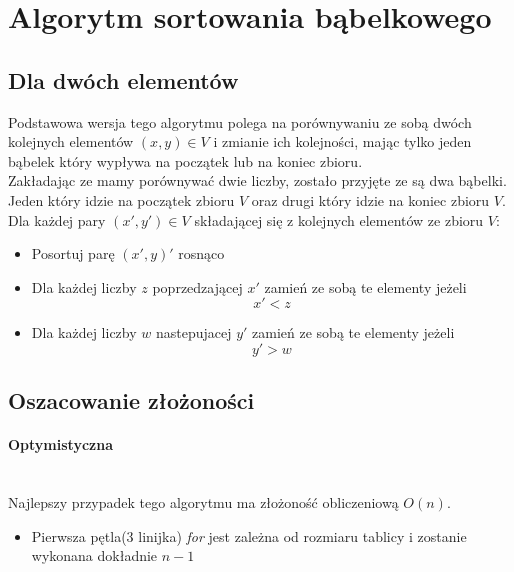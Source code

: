 \FloatBarrier

\section{Algorytm sortowania bąbelkowego}
\subsection{Dla dwóch elementów}
Podstawowa wersja tego algorytmu polega na porównywaniu ze sobą dwóch kolejnych elementów $(x,y) \in V$ i zmianie ich kolejności, mając tylko jeden bąbelek który wypływa na początek lub na koniec zbioru. \\
Zakładając ze mamy porównywać dwie liczby, zostało przyjęte ze są dwa bąbelki. Jeden który idzie na początek zbioru  $V$ oraz drugi który idzie na koniec zbioru $V$. \\
Dla każdej pary $(x',y') \in V$ składającej się z kolejnych elementów ze zbioru $V$:
\begin{itemize} 
\item Posortuj parę $(x',y)'$ rosnąco
\item Dla każdej liczby $z$ poprzedzającej $x'$ zamień ze sobą te elementy jeżeli \begin{equation*}x' < z\end{equation*} 
\item  Dla każdej liczby $w$ nastepujacej $y'$ zamień ze sobą te elementy jeżeli  \begin{equation*}y'>w\end{equation*}
 \end{itemize}  


 \subsection{Oszacowanie złożoności}

\paragraph{Optymistyczna}\mbox{}\\
Najlepszy przypadek tego algorytmu ma złożoność obliczeniową $O(n)$. 
\begin{itemize}
\item Pierwsza pętla(3 linijka) \textit{for} jest zależna od rozmiaru tablicy i zostanie wykonana dokładnie $n-1$
\end{itemize}

